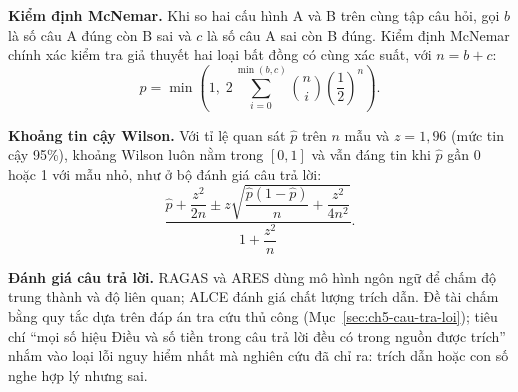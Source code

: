 \textbf{Kiểm định McNemar.} Khi so hai cấu hình A và B trên cùng tập câu hỏi, gọi $b$ là số câu A đúng còn B sai và $c$ là số câu A sai còn B đúng. Kiểm định McNemar chính xác \cite{mcnemar1947} kiểm tra giả thuyết hai loại bất đồng có cùng xác suất, với $n = b + c$:
\begin{equation}
\label{eq:c2_mcnemar}
p = \min\left(1,\; 2 \sum_{i=0}^{\min(b, c)} \binom{n}{i} \left(\frac{1}{2}\right)^{n}\right).
\end{equation}

\textbf{Khoảng tin cậy Wilson.} Với tỉ lệ quan sát $\hat{p}$ trên $n$ mẫu và $z = 1{,}96$ (mức tin cậy 95\%), khoảng Wilson luôn nằm trong $[0, 1]$ và vẫn đáng tin khi $\hat{p}$ gần 0 hoặc 1 với mẫu nhỏ, như ở bộ đánh giá câu trả lời:
\begin{equation}
\label{eq:c2_wilson}
\frac{\hat{p} + \dfrac{z^2}{2n} \pm z\sqrt{\dfrac{\hat{p}(1 - \hat{p})}{n} + \dfrac{z^2}{4n^2}}}{1 + \dfrac{z^2}{n}}.
\end{equation}

\textbf{Đánh giá câu trả lời.} RAGAS \cite{es2024ragas} và ARES \cite{saadfalcon2024ares} dùng mô hình ngôn ngữ để chấm độ trung thành và độ liên quan; ALCE \cite{gao2023alce} đánh giá chất lượng trích dẫn. Đề tài chấm bằng quy tắc dựa trên đáp án tra cứu thủ công (Mục~\ref{sec:ch5-cau-tra-loi}); tiêu chí ``mọi số hiệu Điều và số tiền trong câu trả lời đều có trong nguồn được trích'' nhắm vào loại lỗi nguy hiểm nhất mà nghiên cứu \cite{magesh2025hallucination} đã chỉ ra: trích dẫn hoặc con số nghe hợp lý nhưng sai.
